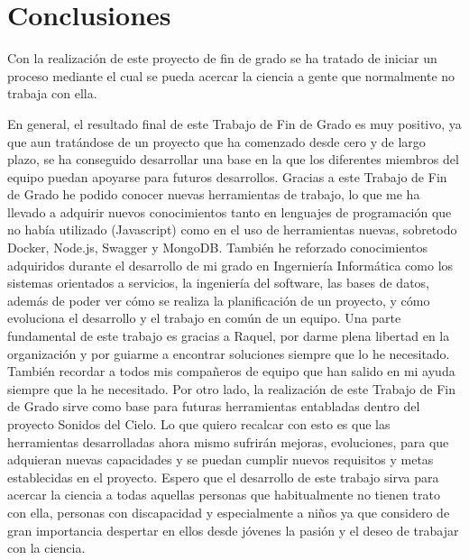\chapter{Conclusiones}

Con la realización de este proyecto de fin de grado se ha tratado de iniciar un proceso mediante el cual se pueda acercar la ciencia a gente que normalmente no trabaja con ella. 

En general, el resultado final de este Trabajo de Fin de Grado es muy positivo, ya que aun tratándose de un proyecto que ha comenzado desde cero y de largo plazo, se ha conseguido desarrollar una base en la que los diferentes miembros del equipo puedan apoyarse para futuros desarrollos. 
Gracias a este Trabajo de Fin de Grado he podido conocer nuevas herramientas de trabajo, lo que me ha llevado a adquirir nuevos conocimientos tanto en lenguajes de programación que no había utilizado (Javascript) como en el uso de herramientas nuevas, sobretodo Docker, Node.js, Swagger y MongoDB. También he reforzado conocimientos adquiridos durante el desarrollo de mi grado en Ingerniería Informática como los sistemas orientados a servicios, la ingeniería del software, las bases de datos, además de poder ver cómo se realiza la planificación de un proyecto, y cómo evoluciona el desarrollo y el trabajo en común de un equipo.
Una parte fundamental de este trabajo es gracias a Raquel, por darme plena libertad en la organización y por guiarme a encontrar soluciones siempre que lo he necesitado. También recordar a todos mis compañeros de equipo que han salido en mi ayuda siempre que la he necesitado.
Por otro lado, la realización de este Trabajo de Fin de Grado sirve como base para futuras herramientas entabladas dentro del proyecto Sonidos del Cielo. Lo que quiero recalcar con esto es que las herramientas desarrolladas ahora mismo sufrirán mejoras, evoluciones, para que adquieran nuevas capacidades y se puedan cumplir nuevos requisitos y metas establecidas en el proyecto.
Espero que el desarrollo de este trabajo sirva para acercar la ciencia a todas aquellas personas que habitualmente no tienen trato con ella, personas con discapacidad y especialmente a niños ya que considero de gran importancia despertar en ellos desde jóvenes la pasión y el deseo de trabajar con la ciencia.
